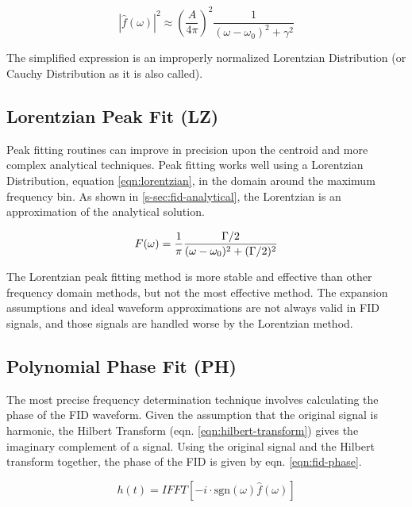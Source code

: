 \begin{equation}
\label{eqn:fid-analytical-expansion}
\left| \hat{f}(\omega) \right|^2 \approx
\left(\frac{A}{4\pi}\right)^2 
\frac{1}{(\omega - \omega_0)^2 + \gamma^2}
\end{equation}

\noindent
The simplified expression is an improperly normalized Lorentzian Distribution (or Cauchy Distribution as it is also called).

\subsection{Lorentzian Peak Fit (LZ)}

Peak fitting routines can improve in precision upon the centroid and more complex analytical techniques.  Peak fitting works well using a Lorentzian Distribution, equation \ref{eqn:lorentzian}, in the domain around the maximum frequency bin. As shown in \ref{s-sec:fid-analytical}, the Lorentzian is an approximation of the analytical solution.

\begin{equation}
\label{eqn:lorentzian}
F(\omega) = \frac{1}{\pi} \\
\frac{\Gamma / 2}{(\omega - \omega_0)^2 + (\Gamma / 2)^2}
\end{equation}

The Lorentzian peak fitting method is more stable and effective than other frequency domain methods, but not the most effective method.  The expansion assumptions and ideal waveform approximations are not always valid in FID signals, and those signals are handled worse by the Lorentzian method.

\subsection{Polynomial Phase Fit (PH)}
The most precise frequency determination technique involves calculating the phase of the FID waveform.  Given the assumption that the original signal is harmonic, the Hilbert Transform (eqn. \ref{eqn:hilbert-transform}) gives the imaginary complement of a signal.  Using the original signal and the Hilbert transform together, the phase of the FID is given by eqn. \ref{eqn:fid-phase}.

\begin{equation}
\label{eqn:hilbert-transform}
h(t) = IFFT[-i \cdot \mathrm{sgn}(\omega) \hat{f}(\omega)]
\end{equation}

